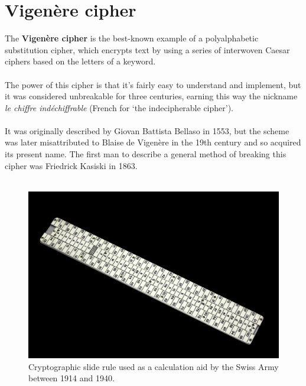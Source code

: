 \documentclass[Lau,binding=0.6cm,oneside]{sapthesis}
\begin{document}
\section{Vigenère cipher}
The \textbf{Vigenère cipher} is the best-known example of a polyalphabetic substitution cipher, which encrypts text by using a series of interwoven Caesar ciphers based on the letters of a keyword\supercite{vigenere1}.\\\\
The power of this cipher is that it's fairly easy to understand and implement, but it was considered unbreakable for three centuries\supercite{vigenere2}, earning this way the nickname \textit{le chiffre indéchiffrable} (French for `the indecipherable cipher').\\\\
It was originally described by Giovan Battista Bellaso in 1553, but the scheme was later misattributed to Blaise de Vigenère in the 19th century and so acquired its present name. The first man to describe a general method of breaking this cipher was Friedrick Kasiski in 1863.\\\\

\begin{figure}[H]
\includegraphics[scale=0.13]{slide_rule}
\captionsetup{justification=centering, margin=2cm}
\centering
\caption{Cryptographic slide rule used as a calculation aid by the Swiss Army between 1914 and 1940.}
\centering
\end{figure}
\end{document}
